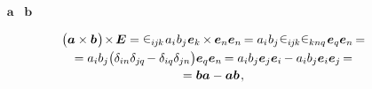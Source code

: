\vspace{-0.15em}\noindent
{}~  ~$\bm{a}$ ~$\bm{b}$

\nopagebreak\vspace{-0.5em}
\begin{multline}\label{vectorcrossvectorcrossidentity}
\bigl( \bm{a} \times \bm{b} \hspace{.15ex}\bigr) \hspace{-0.33ex} \times \hspace{-0.22ex} \UnitDyad
= \levicivita_{i\hspace{-0.1ex}j\hspace{-0.1ex}k} \hspace{.2ex} a_i \hspace{.1ex} b_j \hspace{.1ex} \bm{e}_k \hspace{-0.15ex} \times \hspace{-0.1ex} \bm{e}_n \bm{e}_n \hspace{-0.2ex}
= a_i \hspace{.1ex} b_j \hspace{.1ex} \levicivita_{i\hspace{-0.1ex}j\hspace{-0.1ex}k} \levicivita_{knq} \hspace{.2ex} \bm{e}_q \bm{e}_n \hspace{-0.2ex} =
\\[-0.1em]
%
= a_i b_j \bigl( \delta_{in} \delta_{j\hspace{-0.1ex}q} \hspace{-0.22ex} - \delta_{iq} \delta_{jn} \bigr) \bm{e}_q \bm{e}_n \hspace{-0.2ex}
= a_i b_j \bm{e}_j \bm{e}_i \hspace{-0.12ex} - a_i b_j \bm{e}_i \bm{e}_j \hspace{-0.2ex} =
\\[-0.1em]
%
= \bm{b} \bm{a} - \bm{a} \bm{b}
\hspace{.2ex},
\end{multline}

